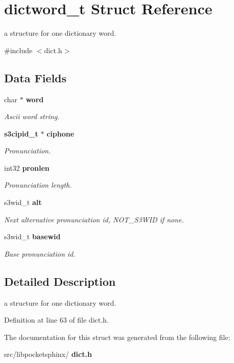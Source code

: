 \section{dictword\+\_\+t Struct Reference}
\label{structdictword__t}


a structure for one dictionary word.  




{\ttfamily \#include $<$dict.\+h$>$}

\subsection*{Data Fields}
\begin{DoxyCompactItemize}
\item 
\mbox{\label{structdictword__t_a3f3371918a406e26817bd4f2cecd7329}} 
char $\ast$ \textbf{ word}
\begin{DoxyCompactList}\small\item\em Ascii word string. \end{DoxyCompactList}\item 
\mbox{\label{structdictword__t_acf5836b5a681485868e9090ad67366d5}} 
\textbf{ s3cipid\+\_\+t} $\ast$ \textbf{ ciphone}
\begin{DoxyCompactList}\small\item\em Pronunciation. \end{DoxyCompactList}\item 
\mbox{\label{structdictword__t_a50509f28a4b64d76519bfadea12f0fa0}} 
int32 \textbf{ pronlen}
\begin{DoxyCompactList}\small\item\em Pronunciation length. \end{DoxyCompactList}\item 
\mbox{\label{structdictword__t_a84b63cd03706221645f46b2da09e9540}} 
s3wid\+\_\+t \textbf{ alt}
\begin{DoxyCompactList}\small\item\em Next alternative pronunciation id, N\+O\+T\+\_\+\+S3\+W\+ID if none. \end{DoxyCompactList}\item 
\mbox{\label{structdictword__t_a53dd72f96a9de21d8925e246cc7c036f}} 
s3wid\+\_\+t \textbf{ basewid}
\begin{DoxyCompactList}\small\item\em Base pronunciation id. \end{DoxyCompactList}\end{DoxyCompactItemize}


\subsection{Detailed Description}
a structure for one dictionary word. 

Definition at line 63 of file dict.\+h.



The documentation for this struct was generated from the following file\+:\begin{DoxyCompactItemize}
\item 
src/libpocketsphinx/\textbf{ dict.\+h}\end{DoxyCompactItemize}
